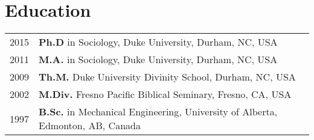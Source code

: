 \section*{Education}
\begin{tabular}{p{} p{}}
2015 & \textbf{Ph.D} in Sociology, Duke University, Durham, NC, USA\\
2011 & \textbf{M.A.} in Sociology, Duke University, Durham, NC, USA \\
2009 & \textbf{Th.M.} Duke University Divinity School, Durham, NC, USA \\
2002 & \textbf{M.Div.} Fresno Pacific Biblical Seminary, Fresno, CA, USA \\
1997 & \textbf{B.Sc.} in Mechanical Engineering, University of Alberta, Edmonton, AB, Canada \\
\end{tabular}